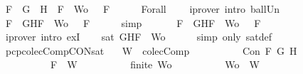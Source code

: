 \begin{isabellebody}
\ {\isachardoublequoteopen}{\isasymforall}F\ {\isasymin}\ {\isacharparenleft}{\isacharbraceleft}G{\isacharbraceright}\ {\isasymunion}\ {\isacharbraceleft}H{\isacharbraceright}{\isacharparenright}\ {\isasymunion}\ {\isacharparenleft}{\isacharbraceleft}F{\isacharbraceright}\ {\isasymunion}\ Wo{\isacharparenright}{\isachardot}\ {\isasymA}\ {\isasymTurnstile}\ F{\isachardoublequoteclose}\isanewline
\ \ \ \ \isamarkupfalse%
\ Forall{}\ {}\ {}\ \isamarkupfalse%
\ {\isacharparenleft}iprover\ intro{\isacharcolon}\ ball{\isacharunderscore}Un{\isacharparenright}\isanewline
\ \ \isamarkupfalse%
\ \isamarkupfalse%
\ {\isachardoublequoteopen}{\isasymforall}F\ {\isasymin}\ {\isacharbraceleft}G{\isacharcomma}H{\isacharcomma}F{\isacharbraceright}\ {\isasymunion}\ Wo{\isachardot}\ {\isasymA}\ {\isasymTurnstile}\ F{\isachardoublequoteclose}\isanewline
\ \ \ \ \isamarkupfalse%
\ simp\isanewline
\ \ \isamarkupfalse%
\ \isamarkupfalse%
\ {\isachardoublequoteopen}{\isasymexists}{\isasymA}{\isachardot}\ {\isasymforall}F\ {\isasymin}\ {\isacharparenleft}{\isacharbraceleft}G{\isacharcomma}H{\isacharcomma}F{\isacharbraceright}\ {\isasymunion}\ Wo{\isacharparenright}{\isachardot}\ {\isasymA}\ {\isasymTurnstile}\ F{\isachardoublequoteclose}\isanewline
\ \ \ \ \isamarkupfalse%
\ {\isacharparenleft}iprover\ intro{\isacharcolon}\ exI{\isacharparenright}\isanewline
\ \ \isamarkupfalse%
\ {\isachardoublequoteopen}sat\ {\isacharparenleft}{\isacharbraceleft}G{\isacharcomma}H{\isacharcomma}F{\isacharbraceright}\ {\isasymunion}\ Wo{\isacharparenright}{\isachardoublequoteclose}\isanewline
\ \ \ \ \isamarkupfalse%
\ {\isacharparenleft}simp\ only{\isacharcolon}\ sat{\isacharunderscore}def{\isacharparenright}\isanewline
{}\isamarkupfalse%
%
\endisatagproof
{\isafoldproof}%
%
\isadelimproof
\isanewline
%
\endisadelimproof
\isanewline
{}\isamarkupfalse%
\ pcp{\isacharunderscore}colecComp{\isacharunderscore}CON{\isacharunderscore}sat{\isacharcolon}\isanewline
\ \ \ {\isachardoublequoteopen}W\ {\isasymin}\ colecComp{\isachardoublequoteclose}\isanewline
\ \ \ \ \ \ \ \ \ \ {\isachardoublequoteopen}Con\ F\ G\ H{\isachardoublequoteclose}\isanewline
\ \ \ \ \ \ \ \ \ \ {\isachardoublequoteopen}F\ {\isasymin}\ W{\isachardoublequoteclose}\isanewline
\ \ \ \ \ \ \ \ \ \ {\isachardoublequoteopen}finite\ Wo{\isachardoublequoteclose}\isanewline
\ \ \ \ \ \ \ \ \ \ {\isachardoublequoteopen}Wo\ {\isasymsubseteq}\ W{\isachardoublequoteclose}\isanewline

\end{isabellebody}
